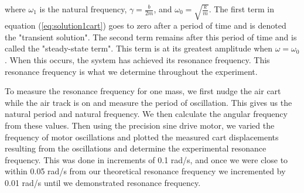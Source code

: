 where $\omega_1$ is the natural frequency, $\gamma = \frac{b}{2m}$, and $\omega_0 = \sqrt{\frac{k}{m}}$. The first term in equation (\ref{eq:solution1cart}) goes to zero after a period of time and is denoted the "transient solution". The second term remains after this period of time and is called the "steady-state term". This term is at its greatest amplitude when $\omega = \omega_0$. When this occurs, the system has achieved its resonance frequency. This resonance frequency is what we determine throughout the experiment.

\par To measure the resonance frequency for one mass, we first nudge the air cart while the air track is on and measure the period of oscillation. This gives us the natural period and natural frequency. We then calculate the angular frequency from these values. Then using the precision sine drive motor, we varied the frequency of motor oscillations and plotted the measured cart displacements resulting from the oscillations and determine the experimental resonance frequency. This was done in increments of 0.1 rad/s, and once we were close to within 0.05 rad/s from our theoretical resonance frequency we incremented by 0.01 rad/s until we demonstrated resonance frequency.




